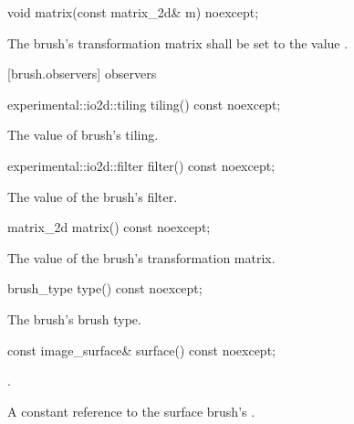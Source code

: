 \begin{itemdecl}
void matrix(const matrix_2d& m) noexcept;
\end{itemdecl}
\begin{itemdescr}
\pnum
\effects
The brush's transformation matrix shall be set to the value .
\end{itemdescr}

 [brush.observers]{ observers}

\begin{itemdecl}
experimental::io2d::tiling tiling() const noexcept;
\end{itemdecl}
\begin{itemdescr}
\pnum
\returns
The value of brush's tiling.
\end{itemdescr}

\begin{itemdecl}
experimental::io2d::filter filter() const noexcept;
\end{itemdecl}
\begin{itemdescr}
\pnum
\returns
The value of the brush's filter.
\end{itemdescr}

\begin{itemdecl}
matrix_2d matrix() const noexcept;
\end{itemdecl}
\begin{itemdescr}
\pnum
\returns
The value of the brush's transformation matrix.
\end{itemdescr}

\begin{itemdecl}
brush_type type() const noexcept;
\end{itemdecl}
\begin{itemdescr}
\pnum
\returns
The brush's brush type.
\end{itemdescr}

\begin{itemdecl}
	const image_surface& surface() const noexcept;
\end{itemdecl}
\begin{itemdescr}
	\pnum
	\requires
	.
	
	\pnum
	\returns
	A constant reference to the surface brush's .
\end{itemdescr}
